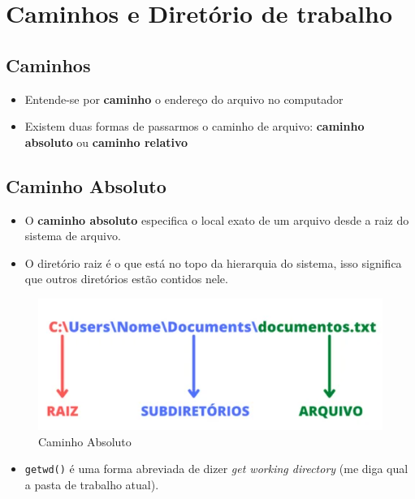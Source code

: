 \documentclass[
  letterpaper,
  DIV=11,
  numbers=noendperiod]{scrartcl}
\providecommand{\tightlist}{%
  \setlength{\itemsep}{0pt}\setlength{\parskip}{0pt}}\usepackage{longtable,booktabs,array}
\begin{document}
\section{Caminhos e Diretório de
trabalho}\label{caminhos-e-diretuxf3rio-de-trabalho}

\subsection{Caminhos}\label{caminhos}

\begin{itemize}
\item
  Entende-se por \textbf{caminho} o endereço do arquivo no computador
\item
  Existem duas formas de passarmos o caminho de arquivo: \textbf{caminho
  absoluto} ou \textbf{caminho relativo}
\end{itemize}

\subsection{Caminho Absoluto}\label{caminho-absoluto}

\begin{itemize}
\item
  O \textbf{caminho absoluto} especifica o local exato de um arquivo
  desde a raiz do sistema de arquivo.
\item
  O diretório raiz é o que está no topo da hierarquia do sistema, isso
  significa que outros diretórios estão contidos nele.
\end{itemize}

\begin{figure}[H]

{\centering \includegraphics{Figuras/dir_geral.png}

}

\caption{Caminho Absoluto}

\end{figure}%

\begin{itemize}
\tightlist
\item
  \texttt{getwd()} é uma forma abreviada de dizer \emph{get working
  directory} (me diga qual a pasta de trabalho atual).
\end{itemize}
\end{document}
